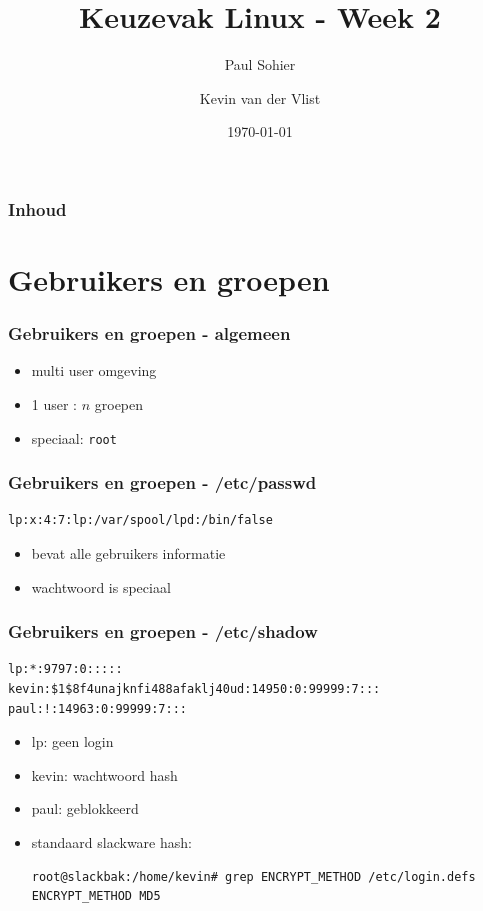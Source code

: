 \documentclass{beamer}
\title{Keuzevak Linux - Week 2}
\author{Paul Sohier \and Kevin van der Vlist}
\institute{Versie $1.0$}
\date{\today}
\begin{document}
\begin{frame}
  \titlepage
\end{frame} 

\begin{frame}
  \frametitle{Inhoud}
  \tableofcontents
\end{frame}

\section{Gebruikers en groepen}

\begin{frame}
  \frametitle{Gebruikers en groepen - algemeen}
  \begin{itemize}
  \item<1-> multi user omgeving
  \item<2-> 1 user : $n$ groepen
  \item<3-> speciaal: \texttt{root}
  \end{itemize}
\end{frame}

\begin{frame}[fragile]
  \frametitle{Gebruikers en groepen - /etc/passwd}
  \begin{lstlisting}
lp:x:4:7:lp:/var/spool/lpd:/bin/false
  \end{lstlisting}
  \begin{itemize}
  \item<2-> bevat alle gebruikers informatie
  \item<3-> wachtwoord is speciaal
  \end{itemize}
\end{frame}

\begin{frame}[fragile]
  \frametitle{Gebruikers en groepen - /etc/shadow}
  \begin{lstlisting}
lp:*:9797:0:::::
kevin:$1$8f4unajknfi488afaklj40ud:14950:0:99999:7:::
paul:!:14963:0:99999:7:::
  \end{lstlisting}
  \begin{itemize}
  \item<2-> lp: geen login
  \item<3-> kevin: wachtwoord hash
  \item<4-> paul: geblokkeerd
  \item<5-> standaard slackware hash:
    \begin{lstlisting}
root@slackbak:/home/kevin# grep ENCRYPT_METHOD /etc/login.defs
ENCRYPT_METHOD MD5
    \end{lstlisting}
  \end{itemize}
\end{frame}
\end{document}
